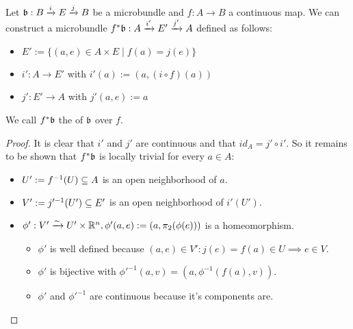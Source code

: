  \\
Let $\bb: \bundle{B}{E}{i}{j}$ be a microbundle and $f: A \to B$ a continuous map.
We can construct a microbundle $f^*\bb: \bundle{A}{E'}{i'}{j'}$ defined as follows:
\begin{itemize}
    \item $E' := \{ (a, e) \in A \times E \mid f(a) = j(e) \}$
    \item $i': A \to E'$ with $i'(a) := (a, (i \circ f)(a))$
    \item $j': E' \to A$ with $j'(a, e) := a$
\end{itemize}
We call $f^*\bb$ the  of $\bb$ over $f$.
\begin{proof}
It is clear that $i'$ and $j'$ are continuous and that $id_A = j' \circ i'$.
So it remains to be shown that $f^*\bb$ is locally trivial for every $a \in A$:
\begin{itemize}
    \item $U' := f^{-1}(U) \sub A$ is an open neighborhood of $a$.
    \item $V' := j'^{-1}(U') \sub E'$ is an open neighborhood of $i'(U')$.
    \item $\phi': V' \isomto U' \times \R^n, \phi'(a, e) := (a, \pi_2(\phi(e)))$ is a homeomorphism.
    \begin{itemize}
        \item $\phi'$ is well defined because $(a, e) \in V': j(e) = f(a) \in U \implies e \in V$.
        \item $\phi'$ is bijective with $\phi'^{-1}(a, v) = (a, \phi^{-1}(f(a), v))$.
        \item $\phi'$ and $\phi'^{-1}$ are continuous because it's components are.
    \end{itemize}
\end{itemize}
\end{proof}